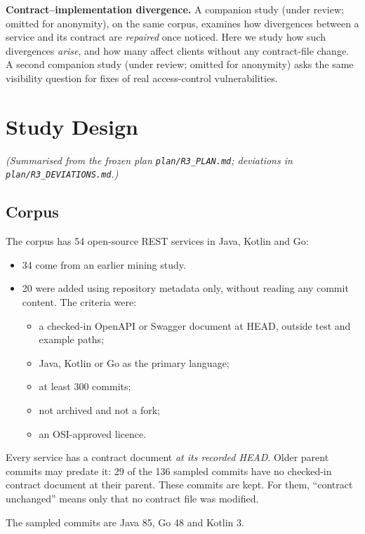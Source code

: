 \documentclass[conference]{IEEEtran}
\begin{document}
\textbf{Contract--implementation divergence.} A companion study (under review; omitted for anonymity), on the same corpus, examines how divergences between a service and its contract are \emph{repaired} once noticed. Here we study how such divergences \emph{arise}, and how many affect clients without any contract-file change. A second companion study (under review; omitted for anonymity) asks the same visibility question for fixes of real access-control vulnerabilities.

\section{Study Design}
\emph{(Summarised from the frozen plan \texttt{plan/\allowbreak{}R3\_PLAN.md}; deviations in \texttt{plan/\allowbreak{}R3\_DEVIATIONS.md}.)}

\subsection{Corpus}
The corpus has 54 open-source REST services in Java, Kotlin and Go:
\begin{itemize}
\item 34 come from an earlier mining study.
\item 20 were added using repository metadata only, without reading any commit content. The criteria were:
\begin{itemize}
\item a checked-in OpenAPI or Swagger document at HEAD, outside test and example paths;
\item Java, Kotlin or Go as the primary language;
\item at least 300 commits;
\item not archived and not a fork;
\item an OSI-approved licence.
\end{itemize}
\end{itemize}

Every service has a contract document \emph{at its recorded HEAD}. Older parent commits may predate it: 29 of the 136 sampled commits have no checked-in contract document at their parent. These commits are kept. For them, ``contract unchanged'' means only that no contract file was modified.

The sampled commits are Java 85, Go 48 and Kotlin 3.
\end{document}
